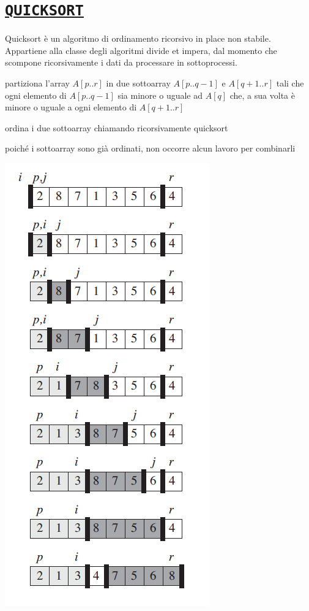 \documentclass[11pt,a4paper]{article}
\begin{document}
\section{\href{https://upload.wikimedia.org/wikipedia/commons/9/9c/Quicksort-example.gif}{\texttt{QUICKSORT}}}
Quicksort è un algoritmo di ordinamento ricorsivo in place non stabile.
Appartiene alla classe degli algoritmi divide et impera, dal momento che
scompone ricorsivamente i dati da processare in sottoprocessi.
\begin{description}[leftmargin=*]
  \item[divide] partiziona l’array $A[p..r]$ in due sottoarray $A[p..q-1]$ e $A[q+1..r]$
  tali che ogni elemento di $A[p..q-1]$ sia minore o uguale ad $A[q]$ che, a sua
  volta è minore o uguale a ogni elemento di $A[q+1..r]$
  \item[impera] ordina i due sottoarray chiamando ricorsivamente quicksort
  \item[combina] poiché i sottoarray sono già ordinati, non occorre alcun
  lavoro per combinarli
\end{description}
\begin{center}
      \includegraphics[scale=0.5]{img/quicksort.png}
\end{center}
\end{document}
